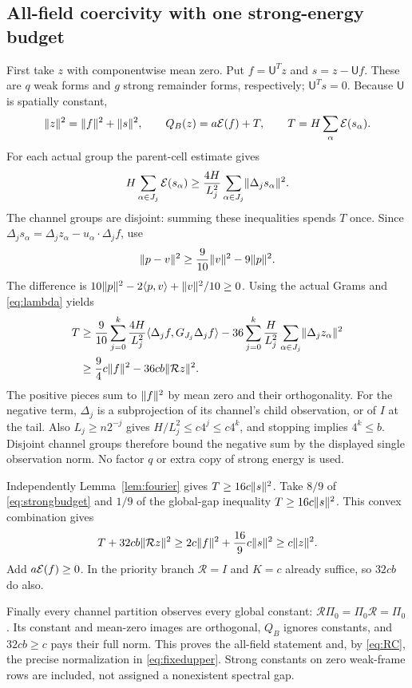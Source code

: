 \subsection{All-field coercivity with one strong-energy budget}
First take $z$ with componentwise mean zero. Put $f=\mathsf U^Tz$ and
$s=z-\mathsf U f$. These are $q$ weak forms and $g$ strong remainder forms,
respectively; $\mathsf U^Ts=0$. Because $\mathsf U$ is spatially constant,
\begin{equation}\label{eq:split}
 \lVert z\rVert^2=\lVert f\rVert^2+\lVert s\rVert^2,\qquad
 Q_B(z)=a\mathcal E(f)+T,\qquad T=H\sum_\alpha\mathcal E(s_\alpha).
\end{equation}
For each actual group the parent-cell estimate gives
\[
 H\sum_{\alpha\in J_j}\mathcal E(s_\alpha)
 \geq\frac{4H}{L_j^2}\sum_{\alpha\in J_j}\lVert \Delta_js_\alpha\rVert^2.
\]
The channel groups are disjoint: summing these inequalities spends $T$ once.
Since $\Delta_js_\alpha=\Delta_jz_\alpha-u_\alpha\cdot\Delta_j f$, use
\[
 \lVert p-v\rVert^2\geq\frac9{10}\lVert v\rVert^2-9\lVert p\rVert^2.
\]
The difference is $10\lVert p\rVert^2-2\langle p,v\rangle+\lVert v\rVert^2/10\geq0$.
Using the actual Grams and \eqref{eq:lambda} yields
\begin{align}\label{eq:strongbudget}
 T&\geq\frac9{10}\sum_{j=0}^k\frac{4H}{L_j^2}
       \langle \Delta_j f,G_{J_j}\Delta_j f\rangle
       -36\sum_{j=0}^k\frac H{L_j^2}
                     \sum_{\alpha\in J_j}\lVert \Delta_jz_\alpha\rVert^2\nonumber\\
 &\geq\frac94c\lVert f\rVert^2-36cb\lVert \mathcal Rz\rVert^2.
\end{align}
The positive pieces sum to $\lVert f\rVert^2$ by mean zero and their orthogonality.
For the negative term, $\Delta_j$ is a subprojection of its channel's child
observation, or of $I$ at the tail. Also $L_j\geq n2^{-j}$ gives
$H/L_j^2\leq c4^j\leq c4^k$, and stopping implies $4^k\leq b$.
Disjoint channel groups therefore bound the negative sum by the displayed
single observation norm. No factor $q$ or extra copy of strong energy is used.

Independently Lemma~\ref{lem:fourier} gives $T\geq16c\lVert s\rVert^2$.
Take $8/9$ of \eqref{eq:strongbudget} and $1/9$ of the global-gap inequality
$T\geq16c\lVert s\rVert^2$. This convex combination gives
\[
 T+32cb\lVert \mathcal Rz\rVert^2
 \geq2c\lVert f\rVert^2+\frac{16}{9}c\lVert s\rVert^2\geq c\lVert z\rVert^2.
\]
Add $a\mathcal E(f)\geq0$. In the priority branch $\mathcal R=I$ and $K=c$
already suffice, so $32cb$ do also.

Finally every channel partition observes every global constant:
$\mathcal R\Pi_0=\Pi_0\mathcal R=\Pi_0$. Its constant and mean-zero images
are orthogonal, $Q_B$ ignores constants, and $32cb\geq c$ pays their full
norm. This proves the all-field statement and, by \eqref{eq:RC}, the precise
normalization in \eqref{eq:fixedupper}. Strong constants on zero weak-frame
rows are included, not assigned a nonexistent spectral gap.

